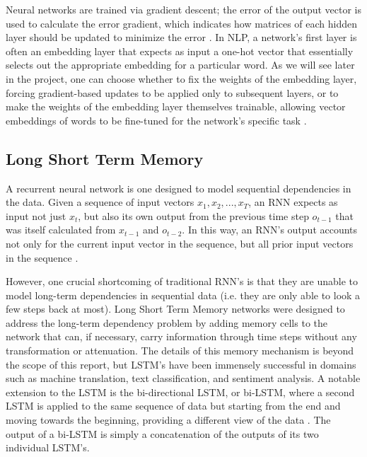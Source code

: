 \documentclass{proc}
\begin{document}
Neural networks are trained via gradient descent; the error of the output vector is used to calculate the error gradient, which indicates how matrices of each hidden layer should be updated to minimize the error \cite{goodfellow-deep-learning}. In NLP, a network's first layer is often an embedding layer that expects as input a one-hot vector that essentially selects out the appropriate embedding for a particular word. As we will see later in the project, one can choose whether to fix the weights of the embedding layer, forcing gradient-based updates to be applied only to subsequent layers, or to make the weights of the embedding layer themselves trainable, allowing vector embeddings of words to be fine-tuned for the network's specific task \cite{collobert-natural}.

\subsection{Long Short Term Memory}

A recurrent neural network is one designed to model sequential dependencies in the data. Given a sequence of input vectors $x_1, x_2, ..., x_T$, an RNN expects as input not just $x_t$, but also its own output from the previous time step $o_{t-1}$ that was itself calculated from $x_{t-1}$ and $o_{t-2}$. In this way, an RNN's output accounts not only for the current input vector in the sequence, but all prior input vectors in the sequence \cite{mandic-recurrent}.

However, one crucial shortcoming of traditional RNN's is that they are unable to model long-term dependencies in sequential data (i.e. they are only able to look a few steps back at most). Long Short Term Memory networks \cite{hochreiter-long} were designed to address the long-term dependency problem by adding memory cells to the network that can, if necessary, carry information through time steps without any transformation or attenuation. The details of this memory mechanism is beyond the scope of this report, but LSTM's have been immensely successful in domains such as machine translation, text classification, and sentiment analysis. A notable extension to the LSTM is the bi-directional LSTM, or bi-LSTM, where a second LSTM is applied to the same sequence of data but starting from the end and moving towards the beginning, providing a different view of the data \cite{schuster-bidirectional}. The output of a bi-LSTM is simply a concatenation of the outputs of its two individual LSTM's.
\end{document}
